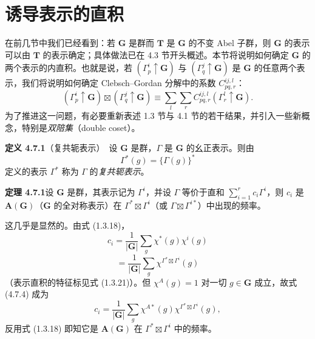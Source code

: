 \section{诱导表示的直积}

在前几节中我们已经看到：若 $\mathbf{G}$ 是群而 $\mathbf{T}$ 是 $\mathbf{G}$ 的不变 Abel 子群，则 $\mathbf{G}$ 的表示可以由 $\mathbf{T}$ 的表示确定；具体做法已在 4.3 节开头概述。本节将说明如何确定 $\mathbf{G}$ 的两个表示的内直积。也就是说，若 $(\Gamma^{i}_{p} \uparrow \mathbf{G})$ 与 $(\Gamma^{j}_{q} \uparrow \mathbf{G})$ 是 $\mathbf{G}$ 的任意两个表示，我们将说明如何确定 Clebsch--Gordan 分解中的系数 $C^{ij, l}_{pq, r}$：
\begin{equation*}
(\Gamma^{i}_{p} \uparrow \mathbf{G}) \boxtimes (\Gamma^{j}_{q} \uparrow \mathbf{G}) \equiv \sum_{l}\sum_{r}C^{ij, l}_{pq, r}(\Gamma^{l}_{r} \uparrow \mathbf{G}).
\tag{4.7.1}
\end{equation*}
为了推进这一问题，有必要重新表述 1.3 节与 4.1 节的若干结果，并引入一些新概念，特别是\textit{双陪集}（double coset）。

\noindent\textbf{定义 4.7.1}\quad （复共轭表示）\ 设 $\mathbf{G}$ 是群，$\Gamma$ 是 $\mathbf{G}$ 的幺正表示。则由
\begin{equation*}
\Gamma^{*}(g) = \{\Gamma(g)\}^{*}
\tag{4.7.2}
\end{equation*}
定义的表示 $\Gamma^{*}$ 称为 $\Gamma$ 的\textit{复共轭表示}。

\noindent\textbf{定理 4.7.1}\quad 设 $\mathbf{G}$ 是群，其表示记为 $\Gamma^{i}$，并设 $\Gamma$ 等价于直和 $\sum^{r}_{i=1}c_{i}\Gamma^{i}$，则 $c_{i}$ 是 $\mathbf{A}(\mathbf{G})$（$\mathbf{G}$ 的全对称表示）在 $\Gamma^{*} \boxtimes \Gamma^{i}$（或 $\Gamma \boxtimes \Gamma^{i*}$）中出现的频率。

这几乎是显然的。由式 (1.3.18)，
\begin{equation*}
c_{i} = \frac{1}{|\mathbf{G}|}\sum_{g}\chi^{*}(g)\chi^{i}(g)
\tag{4.7.3}
\end{equation*}
\begin{equation*}
= \frac{1}{|\mathbf{G}|}\sum_{g}\chi^{\Gamma^{*} \boxtimes \Gamma^{i}}(g)
\tag{4.7.4}
\end{equation*}
（表示直积的特征标见式 (1.3.21)）。但 $\chi^{A}(g) = 1$ 对一切 $g \in \mathbf{G}$ 成立，故式 (4.7.4) 成为
\begin{equation*}
c_{i} = \frac{1}{|\mathbf{G}|}\sum_{g}\chi^{A*}(g)\chi^{\Gamma^{*} \boxtimes \Gamma^{i}}(g),
\tag{4.7.5}
\end{equation*}
反用式 (1.3.18) 即知它是 $\mathbf{A}(\mathbf{G})$ 在 $\Gamma^{*} \boxtimes \Gamma^{i}$ 中的频率。

